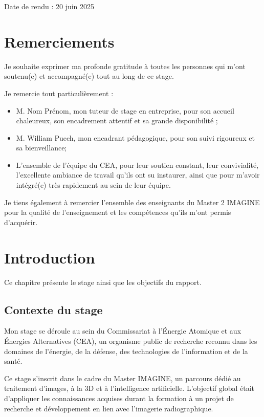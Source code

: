 \documentclass[12pt,a4paper]{report}
\begin{document}
\begin{titlepage}
\begin{center}
\vfill
{\small Date de rendu : 20 juin 2025}

\end{center}
\end{titlepage}

\chapter*{Remerciements}

Je souhaite exprimer ma profonde gratitude à toutes les personnes qui m'ont soutenu(e) et accompagné(e) tout au long de ce stage.

Je remercie tout particulièrement :
\begin{itemize}
  \item M. Nom Prénom, mon tuteur de stage en entreprise, pour son accueil chaleureux, son encadrement attentif et sa grande disponibilité ;
  \item M. William Puech, mon encadrant pédagogique, pour son suivi rigoureux et sa bienveillance;
  \item L’ensemble de l’équipe du CEA, pour leur soutien constant, leur convivialité, l’excellente ambiance de travail qu’ils ont su instaurer, ainsi que pour m’avoir intégré(e) très rapidement au sein de leur équipe.
\end{itemize}

Je tiens également à remercier l’ensemble des enseignants du Master 2 IMAGINE pour la qualité de l’enseignement et les compétences qu’ils m’ont permis d’acquérir.

\tableofcontents
\pagestyle{fancy}
\newpage

\chapter{Introduction}

Ce chapitre présente le stage ainsi que les objectifs du rapport.

\section{Contexte du stage}
Mon stage se déroule au sein du Commissariat à l'Énergie Atomique et aux Énergies Alternatives (CEA), un organisme public de recherche reconnu dans les domaines de l'énergie, de la défense, des technologies de l'information et de la santé.

Ce stage s'inscrit dans le cadre du Master IMAGINE, un parcours dédié au traitement d'images, à la 3D et à l'intelligence artificielle. L'objectif global était d'appliquer les connaissances acquises durant la formation à un projet de recherche et développement en lien avec l'imagerie radiographique.
\end{document}
